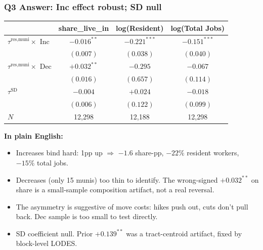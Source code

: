 \documentclass[xcolor = x11names, compress, aspectratio = 169]{beamer}
\renewcommand{\(}{\begin{columns}}
\renewcommand{\)}{\end{columns}}
\newcommand{\<}[1]{\begin{column}{#1}}
\renewcommand{\>}{\end{column}}
\begin{document}
\begin{frame}
\frametitle{Q3 Answer: Inc effect robust; SD null}
    \centering
    \footnotesize
    \begin{tabular}{lccc}
        \toprule
        & share\_live\_in & log(Resident) & log(Total Jobs) \\
        \midrule
        $\tau^{\text{res,muni}} \times $ Inc & $-0.016^{**}$  & $-0.221^{***}$ & $-0.151^{***}$ \\
                                              & $(0.007)$    & $(0.038)$      & $(0.040)$ \\
        $\tau^{\text{res,muni}} \times $ Dec & $+0.032^{**}$  & $-0.295$       & $-0.067$ \\
                                              & $(0.016)$    & $(0.657)$      & $(0.114)$ \\
        $\tau^{\text{SD}}$                    & $-0.004$       & $+0.024$       & $-0.018$ \\
                                              & $(0.006)$    & $(0.122)$      & $(0.099)$ \\
        \midrule
        $N$                                    & 12{,}298 & 12{,}188 & 12{,}298 \\
        \bottomrule
    \end{tabular}
    \vspace{0.10cm}
    \textbf{In plain English:}
    \begin{itemize}\setlength{\itemsep}{0.02cm}\scriptsize
        \item Increases bind hard: 1pp up $\Rightarrow$ $-1.6$ share-pp, $-22\%$ resident workers, $-15\%$ total jobs.
        \item Decreases (only 15 munis) too thin to identify. The wrong-signed $+0.032^{**}$ on share is a small-sample composition artifact, not a real reversal.
        \item The asymmetry is suggestive of move costs: hikes push out, cuts don't pull back. Dec sample is too small to test directly.
        \item SD coefficient null. Prior $+0.139^{**}$ was a tract-centroid artifact, fixed by block-level LODES.
    \end{itemize}
\end{frame}
\end{document}
